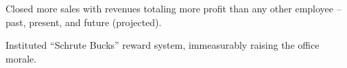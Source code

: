 \begin{achievements}
	\item Closed more sales with revenues totaling more profit than any other employee – past, present, and future (projected).
	\item Instituted “Schrute Bucks” reward system, immeasurably raising the office morale.
\end{achievements}
